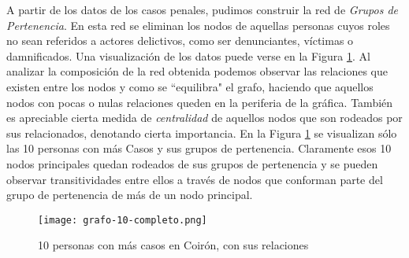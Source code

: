 A partir de los datos de los casos penales, pudimos construir la red de \textit{Grupos de Pertenencia}. En esta red se eliminan los nodos de aquellas personas cuyos roles no sean referidos a actores delictivos, como ser denunciantes, víctimas o damnificados. 
Una visualización de los datos puede verse en la Figura \ref{fig:grafoTop10}.
Al analizar la composición de la red obtenida podemos observar las relaciones que existen entre los nodos y como se ``equilibra" el grafo, haciendo que aquellos nodos con pocas o nulas relaciones queden en la periferia de la gráfica. 
También es apreciable cierta medida de \textit{centralidad} de aquellos nodos que son rodeados por sus relacionados, denotando cierta importancia. 
En la Figura \ref{fig:grafoTop10} se visualizan sólo las 10 personas con más Casos y sus grupos de pertenencia. Claramente esos 10 nodos principales quedan rodeados de sus grupos de pertenencia y se pueden observar transitividades entre ellos a través de nodos que conforman parte del grupo de pertenencia de más de un nodo principal.
\begin{figure}
	\centering
	\texttt{[image: grafo-10-completo.png]}
	\caption{10 personas con más casos en Coirón, con sus relaciones} 
	\label{fig:grafoTop10}
\end{figure}
